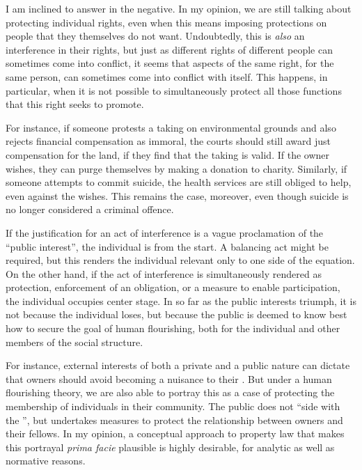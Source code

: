 I am inclined to answer in the negative. In my opinion, we are still talking about protecting individual rights, even when this means imposing protections on people that they themselves do not want. Undoubtedly, this is {\it also} an interference in their rights, but just as different rights of different people can sometimes come into conflict, it seems that aspects of the same right, for the same person, can sometimes come into conflict with itself. This happens, in particular, when it is not possible to simultaneously protect all those functions that this right seeks to promote. 

For instance, if someone protests a taking on environmental grounds and also rejects financial compensation as immoral, the courts should still award just compensation for the land, if they find that the taking is valid. If the owner wishes, they can purge themselves by making a donation to charity. Similarly, if someone attempts to commit suicide, the health services are still obliged to help, even against the  wishes. This remains the case, moreover, even though suicide is no longer considered a criminal offence.

If the justification for an act of interference is a vague proclamation of the ``public interest'', the individual is  from the start. A balancing act might be required, but this renders the individual relevant only to one side of the equation. On the other hand, if the act of interference is simultaneously rendered as protection, enforcement of an obligation, or a measure to enable participation, the individual occupies center stage. In so far as the public interests triumph, it is not because the individual loses, but because the public is deemed to know best how to secure the goal of human flourishing, both for the individual and other members of the social structure.

For instance, external interests of both a private and a public nature can dictate that owners should avoid becoming a nuisance to their . But under a human flourishing theory, we are also able to portray this as a case of protecting the membership of individuals in their community. The public does not ``side with the '', but undertakes measures to protect the relationship between owners and their fellows. In my opinion, a conceptual approach to property law that makes this portrayal {\it prima facie} plausible is highly desirable, for analytic as well as normative reasons.

